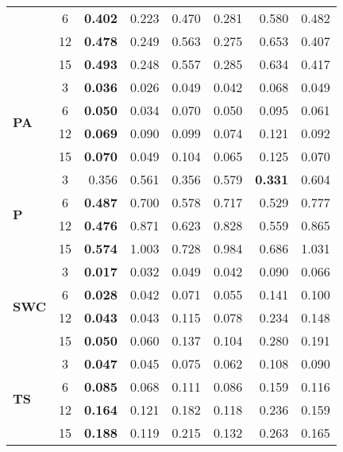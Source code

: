 \begin{table}
\begin{tabular}{p{2.1cm}c|rr|rr|rr}
 & 6 & \bfseries 0.402 & 0.223 & 0.470 & 0.281 & 0.580 & 0.482 \\
 & 12 & \bfseries 0.478 & 0.249 & 0.563 & 0.275 & 0.653 & 0.407 \\
 & 15 & \bfseries 0.493 & 0.248 & 0.557 & 0.285 & 0.634 & 0.417 \\
\cline{1-8}
\multirow[c]{4}{*}{\parbox{2.1cm}{\textbf{PA}}} & 3 & \bfseries 0.036 & 0.026 & 0.049 & 0.042 & 0.068 & 0.049 \\
 & 6 & \bfseries 0.050 & 0.034 & 0.070 & 0.050 & 0.095 & 0.061 \\
 & 12 & \bfseries 0.069 & 0.090 & 0.099 & 0.074 & 0.121 & 0.092 \\
 & 15 & \bfseries 0.070 & 0.049 & 0.104 & 0.065 & 0.125 & 0.070 \\
\cline{1-8}
\multirow[c]{4}{*}{\parbox{2.1cm}{\textbf{P}}} & 3 & 0.356 & 0.561 & 0.356 & 0.579 & \bfseries 0.331 & 0.604 \\
 & 6 & \bfseries 0.487 & 0.700 & 0.578 & 0.717 & 0.529 & 0.777 \\
 & 12 & \bfseries 0.476 & 0.871 & 0.623 & 0.828 & 0.559 & 0.865 \\
 & 15 & \bfseries 0.574 & 1.003 & 0.728 & 0.984 & 0.686 & 1.031 \\
\cline{1-8}
\multirow[c]{4}{*}{\parbox{2.1cm}{\textbf{SWC}}} & 3 & \bfseries 0.017 & 0.032 & 0.049 & 0.042 & 0.090 & 0.066 \\
 & 6 & \bfseries 0.028 & 0.042 & 0.071 & 0.055 & 0.141 & 0.100 \\
 & 12 & \bfseries 0.043 & 0.043 & 0.115 & 0.078 & 0.234 & 0.148 \\
 & 15 & \bfseries 0.050 & 0.060 & 0.137 & 0.104 & 0.280 & 0.191 \\
\cline{1-8}
\multirow[c]{4}{*}{\parbox{2.1cm}{\textbf{TS}}} & 3 & \bfseries 0.047 & 0.045 & 0.075 & 0.062 & 0.108 & 0.090 \\
 & 6 & \bfseries 0.085 & 0.068 & 0.111 & 0.086 & 0.159 & 0.116 \\
 & 12 & \bfseries 0.164 & 0.121 & 0.182 & 0.118 & 0.236 & 0.159 \\
 & 15 & \bfseries 0.188 & 0.119 & 0.215 & 0.132 & 0.263 & 0.165 \\
\cline{1-8}
\bottomrule
\end{tabular}
\end{table}

